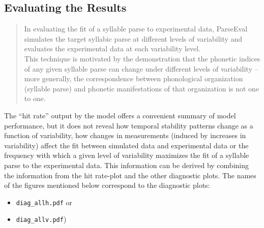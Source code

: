 \documentclass[
draft=false,
toc=graduated,
listof=totoc,
headsepline=true,
]%
{scrartcl}
\begin{document}
\subsection{Evaluating the Results}
\begin{quote}
\glqq{}In evaluating the fit of a syllable parse to experimental data, ParseEval simulates the target syllabic parse at different levels of variability and evaluates the experimental data at each variability level.\\
This technique is motivated by the demonstration that the phonetic indices of any given syllable parse can change under different levels of variability -- more generally, the correspondence between phonological organization (syllable parse) and phonetic manifestations of that organization is not one to one.\grqq{}
\begin{flushright}
\cite[][section 4.2]{Shaw2009}
\end{flushright}
\end{quote}
The \enquote{hit rate} output by the model offers a convenient summary of model performance, but it does not reveal how temporal stability patterns change as a function of variability, how changes in measurements (induced by increases in variability) affect the fit between simulated data and experimental data or the frequency with which a given level of variability maximizes the fit of a syllable parse to the experimental data.
This information can be derived by combining the information from the hit rate-plot and the other diagnostic plots. The names of the figures mentioned below correspond to the diagnostic plots:
\begin{itemize}
\item \texttt{diag\_allh.pdf} or
\item \texttt{diag\_allv.pdf})
\end{itemize}
\end{document}
